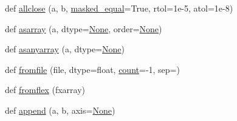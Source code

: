 \begin{DoxyCompactItemize}
\item 
def \hyperlink{namespacenumpy_1_1ma_1_1core_a8cb6a76d67cc23c41ea9fd834d50034c}{allclose} (a, b, \hyperlink{namespacenumpy_1_1ma_1_1core_a001a5dffe6870e8ffa646499d498ec2f}{masked\+\_\+equal}=True, rtol=1e-\/5, atol=1e-\/8)
\item 
def \hyperlink{namespacenumpy_1_1ma_1_1core_aaff6d29c0fe98579d611f41dfd1d0c89}{asarray} (a, dtype=\hyperlink{namespacenumpy_1_1ma_1_1core_a647ee1848dfa3692fe35a663a2aa40b3}{None}, order=\hyperlink{namespacenumpy_1_1ma_1_1core_a647ee1848dfa3692fe35a663a2aa40b3}{None})
\item 
def \hyperlink{namespacenumpy_1_1ma_1_1core_a3fb0819beec8848fbb8910d05b72ef4e}{asanyarray} (a, dtype=\hyperlink{namespacenumpy_1_1ma_1_1core_a647ee1848dfa3692fe35a663a2aa40b3}{None})
\item 
def \hyperlink{namespacenumpy_1_1ma_1_1core_a24f4854b6004a1420f5c71dd02d22ba1}{fromfile} (file, dtype=float, \hyperlink{namespacenumpy_1_1ma_1_1core_affe86f6f5e44d61ddd92f35726b9e626}{count}=-\/1, sep=\textquotesingle{}\textquotesingle{})
\item 
def \hyperlink{namespacenumpy_1_1ma_1_1core_a2c8a2c9e4a2326876993441dee0f36f0}{fromflex} (fxarray)
\item 
def \hyperlink{namespacenumpy_1_1ma_1_1core_a669767dbe91fddc5f602135f776aee64}{append} (a, b, axis=\hyperlink{namespacenumpy_1_1ma_1_1core_a647ee1848dfa3692fe35a663a2aa40b3}{None})
\end{DoxyCompactItemize}
